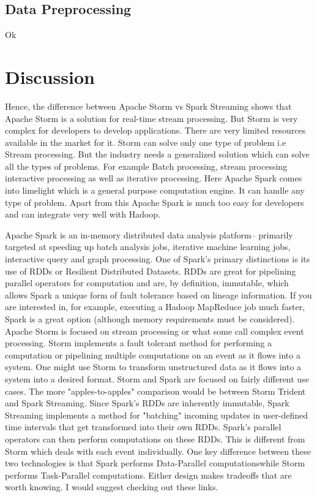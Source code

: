 \documentclass{acmtog} %
\begin{document}
\subsection{Data Preprocessing}
\label{subsec:data_pre}
Ok

\section{Discussion}
\label{sec:results}

Hence, the difference between Apache Storm vs Spark Streaming shows that Apache Storm is a solution for real-time stream processing. But Storm is very complex for developers to develop applications. There are very limited resources available in the market for it.
Storm can solve only one type of problem i.e Stream processing. But the industry needs a generalized solution which can solve all the types of problems. For example Batch processing, stream processing interactive processing as well as iterative processing. Here Apache Spark comes into limelight which is a general purpose computation engine. It can handle any type of problem. Apart from this Apache Spark is much too easy for developers and can integrate very well with Hadoop.

Apache Spark is an in-memory distributed data analysis platform-- primarily targeted at speeding up batch analysis jobs, iterative machine learning jobs, interactive query and graph processing.
One of Spark's primary distinctions is its use of RDDs or Resilient Distributed Datasets. RDDs are great for pipelining parallel operators for computation and are, by definition, immutable, which allows Spark a unique form of fault tolerance based on lineage information. If you are interested in, for example, executing a Hadoop MapReduce job much faster, Spark is a great option (although memory requirements must be considered).
Apache Storm is focused on stream processing or what some call complex event processing. Storm implements a fault tolerant method for performing a computation or pipelining multiple computations on an event as it flows into a system. One might use Storm to transform unstructured data as it flows into a system into a desired format.
Storm and Spark are focused on fairly different use cases. The more "apples-to-apples" comparison would be between Storm Trident and Spark Streaming. Since Spark's RDDs are inherently immutable, Spark Streaming implements a method for "batching" incoming updates in user-defined time intervals that get transformed into their own RDDs. Spark's parallel operators can then perform computations on these RDDs. This is different from Storm which deals with each event individually.
One key difference between these two technologies is that Spark performs Data-Parallel computationswhile Storm performs Task-Parallel computations. Either design makes tradeoffs that are worth knowing. I would suggest checking out these links.
\end{document}
